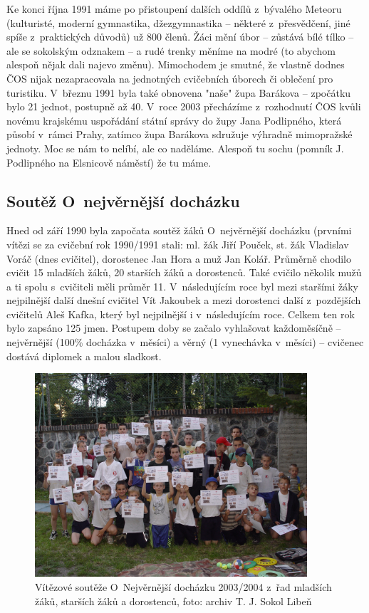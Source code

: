 \documentclass[a5paper, 11pt, twoside]{article}
\begin{document}
Ke konci října 1991 máme po přistoupení dalších oddílů z~bývalého
Meteoru (kulturisté, moderní gymnastika, džezgymnastika -- některé
z~přesvědčení, jiné spíše z~praktických důvodů) už 800 členů. Žáci mění
úbor -- zůstává bílé tílko -- ale se sokolským odznakem -- a rudé trenky
měníme na modré (to abychom alespoň nějak dali najevo změnu). Mimochodem
je smutné, že vlastně dodnes ČOS nijak nezapracovala na jednotných
cvičebních úborech či oblečení pro turistiku. V~březnu 1991 byla také
obnovena "naše" župa Barákova -- zpočátku bylo 21 jednot, postupně až
40. V~roce 2003 přecházíme z~rozhodnutí ČOS kvůli novému krajskému
uspořádání státní správy do župy Jana Podlipného, která působí v~rámci
Prahy, zatímco župa Barákova sdružuje výhradně mimopražské jednoty. Moc
se nám to nelíbí, ale co naděláme. Alespoň tu sochu (pomník J.
Podlipného na Elsnicově náměstí) že tu máme.

\subsection{Soutěž O~nejvěrnější
docházku}

Hned od září 1990 byla započata soutěž žáků O~nejvěrnější docházku
(prvními vítězi se za cvičební rok 1990/1991 stali: ml. žák Jiří Pouček,
st. žák Vladislav Voráč (dnes cvičitel), dorostenec Jan Hora a muž Jan
Kolář. Průměrně chodilo cvičit 15 mladších žáků, 20 starších žáků a
dorostenců. Také cvičilo několik mužů a ti spolu s~cvičiteli měli průměr
11. V~následujícím roce byl mezi staršími žáky nejpilnější další dnešní
cvičitel Vít Jakoubek a mezi dorostenci další z~pozdějších cvičitelů
Aleš Kafka, který byl nejpilnější i v~následujícím roce. Celkem ten rok
bylo zapsáno 125 jmen. Postupem doby se začalo vyhlašovat každoměsíčně
-- nejvěrnější (100\% docházka v~měsíci) a věrný (1 vynechávka v~měsíci)
-- cvičenec dostává diplomek a malou sladkost.

\begin{figure}[h!]
  \centering 
  \includegraphics[width=0.9\textwidth]{img/37_vitezove_dochazka.JPG}
  \caption*{Vítězové soutěže O~Nejvěrnější docházku 2003/2004 z~řad mladších
  žáků, starších žáků a dorostenců, foto: archiv T. J. Sokol Libeň}
\end{figure}
\end{document}
